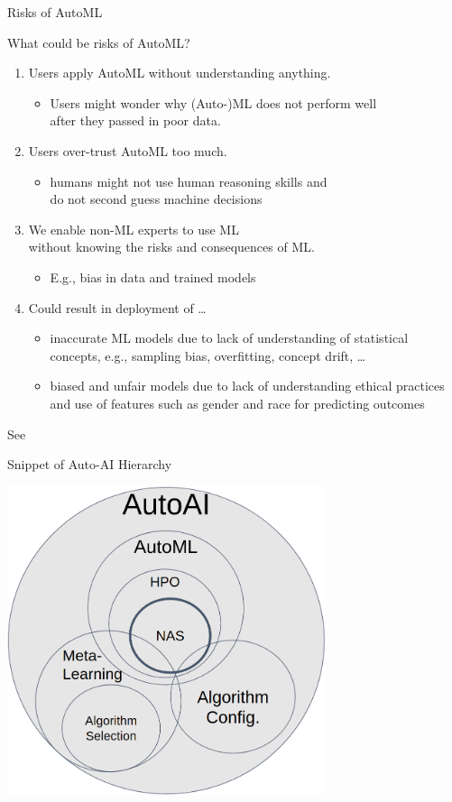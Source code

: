 \begin{frame}[c]{Risks of AutoML}

What could be risks of AutoML?

\begin{enumerate}
  \item Users apply AutoML without understanding anything.
  \begin{itemize}
    \item Users might wonder why (Auto-)ML does not perform well\\ after they passed in poor data. 
  \end{itemize}
  \pause
  \item Users over-trust AutoML too much.
  \begin{itemize}
    \item humans might not use human reasoning skills and\\ do not second guess machine decisions
  \end{itemize}
  \pause
  \item We enable non-ML experts to use ML\\ without knowing the risks and consequences of ML.
  \begin{itemize}
  	\item E.g., bias in data and trained models
  \end{itemize}
  \pause
  \item Could result in deployment of \ldots
  \begin{itemize}
    \item inaccurate ML models due to lack of understanding of statistical concepts, e.g., sampling bias, overfitting, concept drift, \ldots
    \item biased and unfair models due to lack of understanding ethical practices and use of features such as gender and race for predicting outcomes
  \end{itemize}
\end{enumerate}

See 

\end{frame}
\begin{frame}[c]{Snippet of Auto-AI Hierarchy}

\centering
\includegraphics[width=0.7\textwidth]{images/autoai}

\end{frame}

